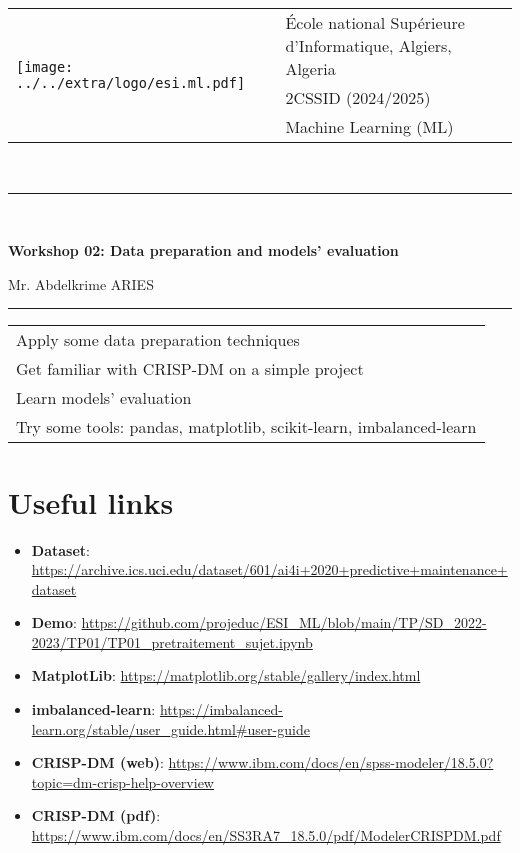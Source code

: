 \documentclass[11pt, a4paper]{article}
\begin{document}
	
	\begin{tabular}{ll}
		\multirow{3}{*}{\texttt{[image: ../../extra/logo/esi.ml.pdf]}} & \'Ecole national Supérieure d'Informatique, Algiers, Algeria\\
		& 2CSSID (2024/2025)\\
		& Machine Learning (ML)
	\end{tabular}\\[.25cm]
	\noindent\rule{\textwidth}{1pt}\\[-0.5cm]
	\begin{center}
		{\LARGE \textbf{Workshop 02: Data preparation and models' evaluation}}
		\begin{flushright}
			Mr. Abdelkrime ARIES
		\end{flushright}
	\end{center}\vspace{-.25cm}
	\noindent\rule{\textwidth}{1pt}
	
	
	\begin{center}
		\begin{tabular}{|p{}|}
		\hline
		Apply some data preparation techniques \\
		Get familiar with CRISP-DM on a simple project\\
		Learn models' evaluation \\
		Try some tools: pandas, matplotlib, scikit-learn, imbalanced-learn \\
		\hline
	\end{tabular}
	\end{center}

\section*{Useful links}

\begin{itemize}
	\item \textbf{Dataset}: {\scriptsize \url{https://archive.ics.uci.edu/dataset/601/ai4i+2020+predictive+maintenance+dataset}} 
	\item \textbf{Demo}: {\scriptsize \url{https://github.com/projeduc/ESI_ML/blob/main/TP/SD_2022-2023/TP01/TP01_pretraitement_sujet.ipynb}}
	\item \textbf{MatplotLib}: {\scriptsize \url{https://matplotlib.org/stable/gallery/index.html}}
	\item \textbf{imbalanced-learn}: {\scriptsize \url{https://imbalanced-learn.org/stable/user_guide.html#user-guide}}
	\item \textbf{CRISP-DM (web)}: {\scriptsize \url{https://www.ibm.com/docs/en/spss-modeler/18.5.0?topic=dm-crisp-help-overview}}
	\item  \textbf{CRISP-DM (pdf)}: {\scriptsize \url{https://www.ibm.com/docs/en/SS3RA7_18.5.0/pdf/ModelerCRISPDM.pdf}}
\end{itemize}
\end{document}
